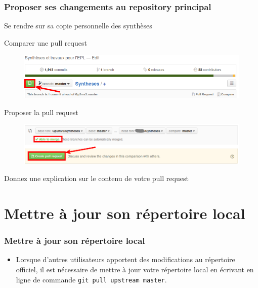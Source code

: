 \documentclass{beamer}
\newenvironment{wideitemize}{\itemize\addtolength{\itemsep}{10pt}}{\enditemize}
\begin{document}
\begin{frame}
    \frametitle{Proposer ses changements au repository principal}
    \begin{wideitemize}
        \item Se rendre sur sa copie personnelle des synthèses
        \pause
        \item Comparer une pull request
            \begin{figure}[H]
                \centering
                \includegraphics[width=\linewidth]{pull_request.png}
            \end{figure}
         \pause
         \item Proposer la pull request
            \begin{figure}[H]
                \centering
                \includegraphics[width=\linewidth]{create_pull_request.png}
            \end{figure}
         \pause
         \item Donnez une explication sur le contenu de votre pull request
     \end{wideitemize}
\end{frame}

\section{Mettre à jour son répertoire local}

\begin{frame}
    \frametitle{Mettre à jour son répertoire local}
    \begin{itemize}
        \item Lorsque d'autres utilisateurs apportent des modifications au répertoire officiel, il est nécessaire de mettre à jour votre répertoire local en écrivant en ligne de commande \lstinline[mathescape]|git pull upstream master|.
    \end{itemize}
\end{frame}
\end{document}
